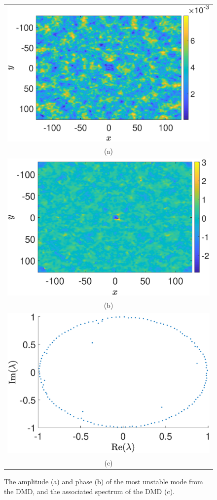 \documentclass[a4paper,11pt]{article}
\begin{document}
\begin{figure}
\centering
\begin{tabular}{c}
\includegraphics[width=.7\textwidth]{dmd_amplitude_K_128_Lx_128_tf_1pt5e4} \\
(a) \\
\includegraphics[width=.7\textwidth]{dmd_phase_K_128_Lx_128_tf_1pt5e4} \\
 (b) \\
\includegraphics[width=.7\textwidth]{dmd_spectrum_K_128_Lx_128_tf_1pt5e4} \\
(c)
\end{tabular}
\caption{The amplitude (a) and phase (b) of the most unstable mode from the DMD, and the associated spectrum of the DMD (c).}
\end{figure}
\end{document}
